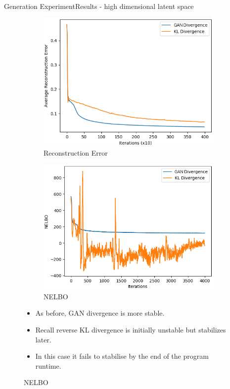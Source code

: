 \documentclass{beamer}
\begin{document}
\begin{frame}{Generation Experiment}{Results - high dimensional latent space}
\begin{figure}
\begin{subfigure}{0.49\textwidth}
\includegraphics[width=\linewidth]{part4reconerrors/PCADVvsPCKLD.png}
\caption{Reconstruction Error}
\end{subfigure}
\begin{subfigure}{0.49\textwidth}
\includegraphics[width=\linewidth]{part4nelbos/PCADVvsPCKLD.png}
\caption{NELBO}
\end{subfigure}
\begin{itemize}
\item As before, GAN divergence is more stable.
\item Recall reverse KL divergence is initially unstable but stabilizes later.
\item In this case it fails to stabilise by the end of the program runtime.
\end{itemize}
\end{figure}

\end{frame}
\end{document}
